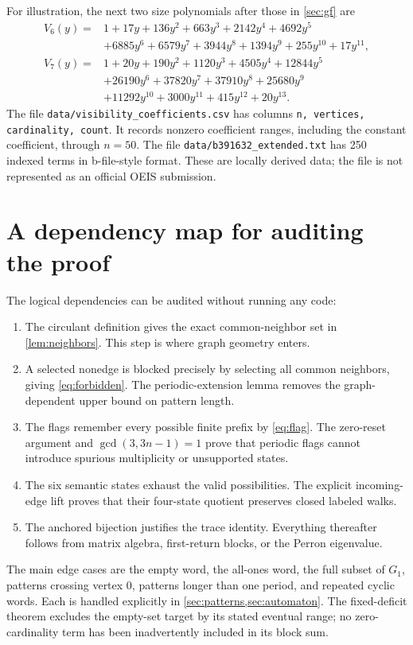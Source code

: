\documentclass[11pt,a4paper]{article}
\theoremstyle{definition}
\begin{document}
For illustration, the next two size polynomials after those in
\cref{sec:gf} are
\begin{align*}
V_6(y)={}&1+17y+136y^2+663y^3+2142y^4+4692y^5\\
 &+6885y^6+6579y^7+3944y^8+1394y^9+255y^{10}+17y^{11},\\
V_7(y)={}&1+20y+190y^2+1120y^3+4505y^4+12844y^5\\
 &+26190y^6+37820y^7+37910y^8+25680y^9\\
 &+11292y^{10}+3000y^{11}+415y^{12}+20y^{13}.
\end{align*}
The file \texttt{data/visibility\_coefficients.csv} has columns
\texttt{n, vertices, cardinality, count}. It records nonzero coefficient
ranges, including the constant coefficient, through $n=50$.
The file \texttt{data/b391632\_extended.txt} has 250 indexed terms in
b-file-style format. These are locally derived data; the file is not
represented as an official OEIS submission.

\section{A dependency map for auditing the proof}
\label{app:audit}

The logical dependencies can be audited without running any code:
\begin{enumerate}
\item The circulant definition gives the exact common-neighbor set in
\cref{lem:neighbors}. This step is where graph geometry enters.
\item A selected nonedge is blocked precisely by selecting all common
neighbors, giving \cref{eq:forbidden}. The periodic-extension lemma removes
the graph-dependent upper bound on pattern length.
\item The flags remember every possible finite prefix by
\cref{eq:flag}. The zero-reset argument and $\gcd(3,3n-1)=1$ prove that
periodic flags cannot introduce spurious multiplicity or unsupported states.
\item The six semantic states exhaust the valid possibilities. The explicit
incoming-edge lift proves that their four-state quotient preserves closed
labeled walks.
\item The anchored bijection justifies the trace identity. Everything
thereafter follows from matrix algebra, first-return blocks, or the
Perron eigenvalue.
\end{enumerate}

The main edge cases are the empty word, the all-ones word, the full subset
of $G_1$, patterns crossing vertex $0$, patterns longer than one period,
and repeated cyclic words. Each is handled explicitly in
\cref{sec:patterns,sec:automaton}. The fixed-deficit theorem excludes the
empty-set target by its stated eventual range; no zero-cardinality term
has been inadvertently included in its block sum.
\end{document}
